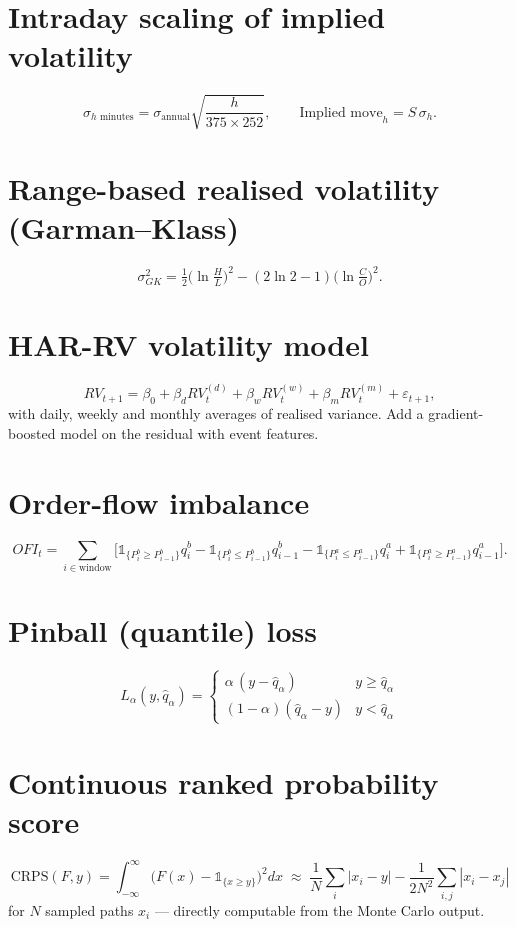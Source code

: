 \section*{Intraday scaling of implied volatility}
\[
\sigma_{h\text{ minutes}} = \sigma_{\text{annual}}\sqrt{\frac{h}{375\times252}},
\qquad
\text{Implied move}_h = S\,\sigma_{h}.
\]

\section*{Range-based realised volatility (Garman--Klass)}
\[
\sigma^2_{GK} = \tfrac{1}{2}\big(\ln \tfrac{H}{L}\big)^2
- (2\ln 2 - 1)\big(\ln \tfrac{C}{O}\big)^2 .
\]

\section*{HAR-RV volatility model}
\[
RV_{t+1} = \beta_0 + \beta_d RV_t^{(d)} + \beta_w RV_t^{(w)}
+ \beta_m RV_t^{(m)} + \varepsilon_{t+1},
\]
with daily, weekly and monthly averages of realised variance. Add a
gradient-boosted model on the residual with event features.

\section*{Order-flow imbalance}
\[
OFI_t = \sum_{i \in \text{window}}
\big[\mathbb{1}_{\{P^b_i \ge P^b_{i-1}\}} q^b_i - \mathbb{1}_{\{P^b_i \le P^b_{i-1}\}} q^b_{i-1}
- \mathbb{1}_{\{P^a_i \le P^a_{i-1}\}} q^a_i + \mathbb{1}_{\{P^a_i \ge P^a_{i-1}\}} q^a_{i-1}\big].
\]

\section*{Pinball (quantile) loss}
\[
L_\alpha(y,\hat q_\alpha) =
\begin{cases}
\alpha\,(y - \hat q_\alpha) & y \ge \hat q_\alpha\\
(1-\alpha)(\hat q_\alpha - y) & y < \hat q_\alpha
\end{cases}
\]

\section*{Continuous ranked probability score}
\[
\text{CRPS}(F, y) = \int_{-\infty}^{\infty}\big(F(x) - \mathbb{1}_{\{x \ge y\}}\big)^2 dx
\;\approx\; \frac{1}{N}\sum_i |x_i - y| - \frac{1}{2N^2}\sum_{i,j}|x_i - x_j|
\]
for $N$ sampled paths $x_i$ --- directly computable from the Monte Carlo output.

